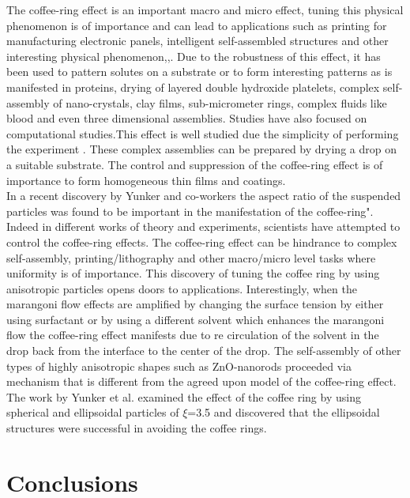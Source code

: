 \documentclass[aps,secnumarabic,nobalancelastpage,amssymb,
nofootinbib,nobibnotes,amsmath,prl,longbibliography,12pt]{revtex4-1}
\begin{document}
The coffee-ring effect is an important macro and micro effect, tuning this physical phenomenon is of importance and can lead to applications such as printing\cite{Inkjet} for manufacturing electronic panels, intelligent self-assembled   structures\cite{C4SM01784F} and other interesting physical phenomenon\cite{C2SM27089G},\cite{Stoneparticle},\cite{PhysRevE.53.1994}. Due to the robustness of this effect, it has been used to pattern solutes on a substrate or to form interesting patterns as is manifested in proteins\cite{Proteinsensor}, drying of layered double hydroxide platelets\cite{Zhang201311}, complex self-assembly of nano-crystals\cite{MinPRL}, clay films\cite{wang2013self}, sub-micrometer rings\cite{submicroange}, complex fluids like blood\cite{Sobac201434} and even three dimensional assemblies\cite{Choi}. Studies have also focused on computational studies\cite{compunan}\cite{LBsim}.This effect is well studied due the simplicity of performing the experiment . These complex assemblies can be prepared by drying a drop on a suitable substrate. The control and suppression of the coffee-ring effect is of importance to form homogeneous thin films and coatings.\cite{semiconductorgrowth}\\

In a recent discovery by Yunker and co-workers\cite{yodhnat} the aspect ratio of the suspended particles was found to be important in the manifestation of the coffee-ring". Indeed in different works of theory and experiments, scientists have attempted to control the coffee-ring effects. The coffee-ring effect can be hindrance to complex self-assembly, printing/lithography and other macro/micro level tasks where uniformity is of importance. This discovery of tuning the coffee ring by using anisotropic particles opens doors to applications. Interestingly, when the marangoni flow effects are amplified by changing the surface tension by either using surfactant\cite{YodhSDS} or by using a different solvent which enhances the marangoni flow\cite{hu2006marangoni} the coffee-ring effect manifests due to re circulation of the solvent in the drop back from the interface to the center of the drop. The self-assembly of other types of highly anisotropic shapes such as ZnO-nanorods\cite{C4SM00887A} proceeded via mechanism that is different from the agreed upon model of the coffee-ring effect.\\

The work by Yunker et al.\cite{yodhnat} examined the effect of the coffee ring by using spherical and ellipsoidal particles of $\xi$=3.5 and discovered that the ellipsoidal structures were successful in avoiding the coffee rings.



\section{Conclusions}



\end{document}
